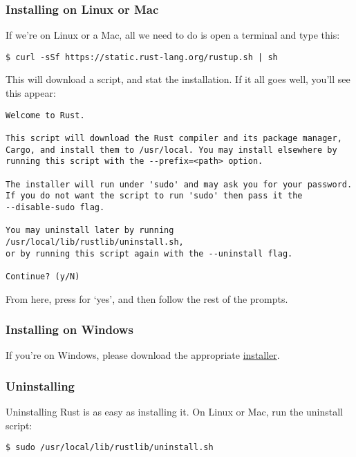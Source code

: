 \subsubsection*{Installing on Linux or Mac}

If we're on Linux or a Mac, all we need to do is open a terminal and type this:

\begin{verbatim}
$ curl -sSf https://static.rust-lang.org/rustup.sh | sh
\end{verbatim}

This will download a script, and stat the installation. If it all goes well, you'll see this appear:

\begin{verbatim}
Welcome to Rust.

This script will download the Rust compiler and its package manager, 
Cargo, and install them to /usr/local. You may install elsewhere by 
running this script with the --prefix=<path> option.

The installer will run under 'sudo' and may ask you for your password. 
If you do not want the script to run 'sudo' then pass it the 
--disable-sudo flag.

You may uninstall later by running /usr/local/lib/rustlib/uninstall.sh,
or by running this script again with the --uninstall flag.

Continue? (y/N)
\end{verbatim}

From here, press  for ‘yes’, and then follow the rest of the prompts.

\subsubsection*{Installing on Windows}

If you're on Windows, please download the appropriate \href{https://www.rust-lang.org/install.html}{installer}.

\subsubsection*{Uninstalling}

Uninstalling Rust is as easy as installing it. On Linux or Mac, run the uninstall script:

\begin{verbatim}
$ sudo /usr/local/lib/rustlib/uninstall.sh
\end{verbatim}

